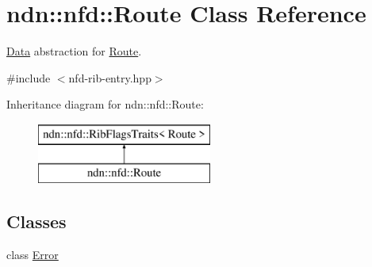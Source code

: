 \hypertarget{classndn_1_1nfd_1_1Route}{}\section{ndn\+:\+:nfd\+:\+:Route Class Reference}
\label{classndn_1_1nfd_1_1Route}


\hyperlink{classndn_1_1Data}{Data} abstraction for \hyperlink{classndn_1_1nfd_1_1Route}{Route}.  




{\ttfamily \#include $<$nfd-\/rib-\/entry.\+hpp$>$}

Inheritance diagram for ndn\+:\+:nfd\+:\+:Route\+:\begin{figure}[H]
\begin{center}
\leavevmode
\includegraphics[height=2.000000cm]{classndn_1_1nfd_1_1Route}
\end{center}
\end{figure}
\subsection*{Classes}
\begin{DoxyCompactItemize}
\item 
class \hyperlink{classndn_1_1nfd_1_1Route_1_1Error}{Error}
\end{DoxyCompactItemize}
